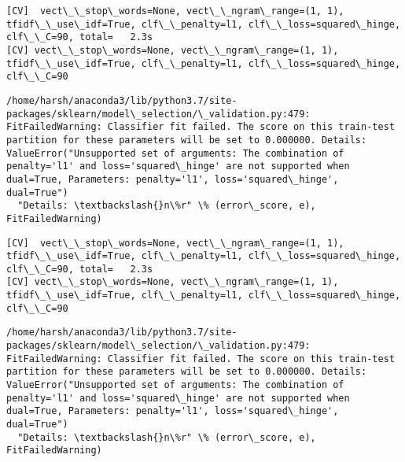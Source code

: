 \documentclass[11pt]{article}
\begin{document}
    \begin{Verbatim}[commandchars=\\\{\}]
[CV]  vect\_\_stop\_words=None, vect\_\_ngram\_range=(1, 1), tfidf\_\_use\_idf=True, clf\_\_penalty=l1, clf\_\_loss=squared\_hinge, clf\_\_C=90, total=   2.3s
[CV] vect\_\_stop\_words=None, vect\_\_ngram\_range=(1, 1), tfidf\_\_use\_idf=True, clf\_\_penalty=l1, clf\_\_loss=squared\_hinge, clf\_\_C=90 

    \end{Verbatim}

    \begin{Verbatim}[commandchars=\\\{\}]
/home/harsh/anaconda3/lib/python3.7/site-packages/sklearn/model\_selection/\_validation.py:479: FitFailedWarning: Classifier fit failed. The score on this train-test partition for these parameters will be set to 0.000000. Details: 
ValueError("Unsupported set of arguments: The combination of penalty='l1' and loss='squared\_hinge' are not supported when dual=True, Parameters: penalty='l1', loss='squared\_hinge', dual=True")
  "Details: \textbackslash{}n\%r" \% (error\_score, e), FitFailedWarning)

    \end{Verbatim}

    \begin{Verbatim}[commandchars=\\\{\}]
[CV]  vect\_\_stop\_words=None, vect\_\_ngram\_range=(1, 1), tfidf\_\_use\_idf=True, clf\_\_penalty=l1, clf\_\_loss=squared\_hinge, clf\_\_C=90, total=   2.3s
[CV] vect\_\_stop\_words=None, vect\_\_ngram\_range=(1, 1), tfidf\_\_use\_idf=True, clf\_\_penalty=l1, clf\_\_loss=squared\_hinge, clf\_\_C=90 

    \end{Verbatim}

    \begin{Verbatim}[commandchars=\\\{\}]
/home/harsh/anaconda3/lib/python3.7/site-packages/sklearn/model\_selection/\_validation.py:479: FitFailedWarning: Classifier fit failed. The score on this train-test partition for these parameters will be set to 0.000000. Details: 
ValueError("Unsupported set of arguments: The combination of penalty='l1' and loss='squared\_hinge' are not supported when dual=True, Parameters: penalty='l1', loss='squared\_hinge', dual=True")
  "Details: \textbackslash{}n\%r" \% (error\_score, e), FitFailedWarning)

    \end{Verbatim}
\end{document}
